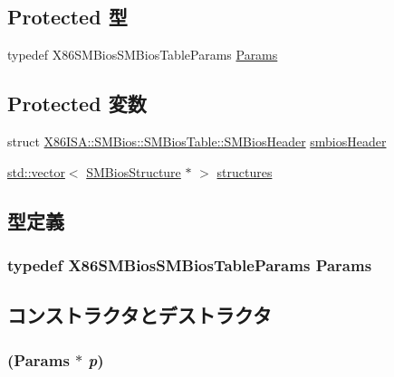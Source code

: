 \subsection*{Protected 型}
\begin{DoxyCompactItemize}
\item 
typedef X86SMBiosSMBiosTableParams \hyperlink{classX86ISA_1_1SMBios_1_1SMBiosTable_a53bcb95b42fba31b72dea12caeeed9cf}{Params}
\end{DoxyCompactItemize}
\subsection*{Protected 変数}
\begin{DoxyCompactItemize}
\item 
struct \hyperlink{structX86ISA_1_1SMBios_1_1SMBiosTable_1_1SMBiosHeader}{X86ISA::SMBios::SMBiosTable::SMBiosHeader} \hyperlink{classX86ISA_1_1SMBios_1_1SMBiosTable_afd906d478b7ba5149013125da68c4eb9}{smbiosHeader}
\item 
\hyperlink{classstd_1_1vector}{std::vector}$<$ \hyperlink{classX86ISA_1_1SMBios_1_1SMBiosStructure}{SMBiosStructure} $\ast$ $>$ \hyperlink{classX86ISA_1_1SMBios_1_1SMBiosTable_a6fbbb38d1b8f7ce977a28367efb09b7c}{structures}
\end{DoxyCompactItemize}


\subsection{型定義}
\hypertarget{classX86ISA_1_1SMBios_1_1SMBiosTable_a53bcb95b42fba31b72dea12caeeed9cf}{
\subsubsection[{Params}]{\setlength{\rightskip}{0pt plus 5cm}typedef X86SMBiosSMBiosTableParams {\bf Params}}}
\label{classX86ISA_1_1SMBios_1_1SMBiosTable_a53bcb95b42fba31b72dea12caeeed9cf}


\subsection{コンストラクタとデストラクタ}
\hypertarget{classX86ISA_1_1SMBios_1_1SMBiosTable_ace99a7f5fa8efd3e8c7b26adbd98f7f3}{
\subsubsection[{SMBiosTable}]{ ({\bf Params} $\ast$ {\em p})}}
\label{classX86ISA_1_1SMBios_1_1SMBiosTable_ace99a7f5fa8efd3e8c7b26adbd98f7f3}



